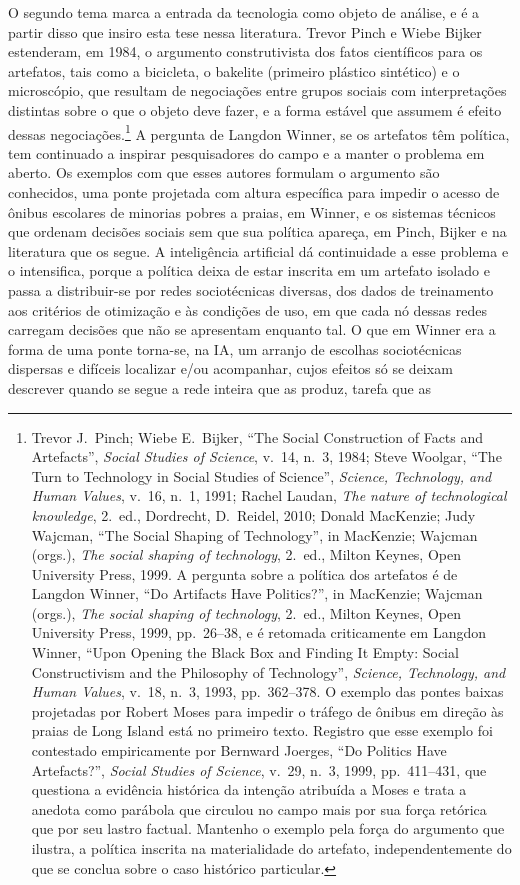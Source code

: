 O segundo tema marca a entrada da tecnologia como objeto de análise, e é a partir disso que insiro esta tese nessa literatura. Trevor Pinch e Wiebe Bijker estenderam, em 1984, o argumento construtivista dos fatos científicos para os artefatos, tais como a bicicleta, o bakelite (primeiro plástico sintético) e o microscópio, que resultam de negociações entre grupos sociais com interpretações distintas sobre o que o objeto deve fazer, e a forma estável que assumem é efeito dessas negociações.\footnote{Trevor J.~Pinch; Wiebe E.~Bijker, \enquote{The Social Construction of Facts and Artefacts}, \textit{Social Studies of Science}, v.~14, n.~3, 1984; Steve Woolgar, \enquote{The Turn to Technology in Social Studies of Science}, \textit{Science, Technology, and Human Values}, v.~16, n.~1, 1991; Rachel Laudan, \textit{The nature of technological knowledge}, 2.~ed., Dordrecht, D.~Reidel, 2010; Donald MacKenzie; Judy Wajcman, \enquote{The Social Shaping of Technology}, in MacKenzie; Wajcman (orgs.), \textit{The social shaping of technology}, 2.~ed., Milton Keynes, Open University Press, 1999. A pergunta sobre a política dos artefatos é de Langdon Winner, \enquote{Do Artifacts Have Politics?}, in MacKenzie; Wajcman (orgs.), \textit{The social shaping of technology}, 2.~ed., Milton Keynes, Open University Press, 1999, pp.~26--38, e é retomada criticamente em Langdon Winner, \enquote{Upon Opening the Black Box and Finding It Empty: Social Constructivism and the Philosophy of Technology}, \textit{Science, Technology, and Human Values}, v.~18, n.~3, 1993, pp.~362--378. O exemplo das pontes baixas projetadas por Robert Moses para impedir o tráfego de ônibus em direção às praias de Long Island está no primeiro texto. Registro que esse exemplo foi contestado empiricamente por Bernward Joerges, \enquote{Do Politics Have Artefacts?}, \textit{Social Studies of Science}, v.~29, n.~3, 1999, pp.~411--431, que questiona a evidência histórica da intenção atribuída a Moses e trata a anedota como parábola que circulou no campo mais por sua força retórica que por seu lastro factual. Mantenho o exemplo pela força do argumento que ilustra, a política inscrita na materialidade do artefato, independentemente do que se conclua sobre o caso histórico particular.} A pergunta de Langdon Winner, se os artefatos têm política, tem continuado a inspirar pesquisadores do campo e a manter o problema em aberto. Os exemplos com que esses autores formulam o argumento são conhecidos, uma ponte projetada com altura específica para impedir o acesso de ônibus escolares de minorias pobres a praias, em Winner, e os sistemas técnicos que ordenam decisões sociais sem que sua política apareça, em Pinch, Bijker e na literatura que os segue. A inteligência artificial dá continuidade a esse problema e o intensifica, porque a política deixa de estar inscrita em um artefato isolado e passa a distribuir-se por redes sociotécnicas diversas, dos dados de treinamento aos critérios de otimização e às condições de uso, em que cada nó dessas redes carregam decisões que não se apresentam enquanto tal. O que em Winner era a forma de uma ponte torna-se, na IA, um arranjo de escolhas sociotécnicas dispersas e difíceis localizar e/ou acompanhar, cujos efeitos só se deixam descrever quando se segue a rede inteira que as produz, tarefa que as 